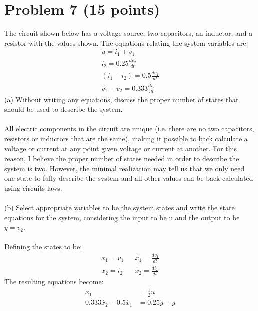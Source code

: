 \documentclass[paper=a4,margin, fontsize=11pt]{scrartcl} %
\numberwithin{equation}{section} %
\numberwithin{figure}{section} %
\numberwithin{table}{section} %
\begin{document}
\section*{Problem 7 (15 points)}
The circuit shown below has a voltage source, two capacitors, an inductor, and a resistor with the values shown.  The equations relating the system variables are:
\begin{align*}
u=i_1+v_1\\
i_2=0.25\frac{dv_2}{dt}\\
(i_1-i_2)=0.5\frac{dv_1}{dt}\\
v_1-v_2=0.333\frac{di_2}{dt}
\end{align*}
(a) Without writing any equations, discuss the proper number of states that should be used to describe the system.\\
\\
All electric components in the circuit are unique (i.e. there are no two capacitors, resistors or inductors that are the same), making it possible to back calculate a voltage or current at any point given voltage or current at another.  For this reason, I believe the proper number of states needed in order to describe the system is two. However, the minimal realization may tell us that we only need one state to fully describe the system and all other values can be back calculated using circuits laws.\\
\\
(b) Select appropriate variables to be the system states and write the state equations for the system, considering the input to be u and the output to be $y=v_2$.\\
\\
Defining the states to be:
\begin{align*}
x_1=v_1 && \dot{x_1}=\frac{dv_1}{dt}\\
x_2=i_2 && \dot{x_2}=\frac{di_2}{dt}
\end{align*}
The resulting equations become:
\begin{align*}
x_1&=\frac{1}{2}u\\
0.333\dot{x_2}-0.5\dot{x_1}&=0.25\dot{y}-y\\
\end{align*}
\end{document}
